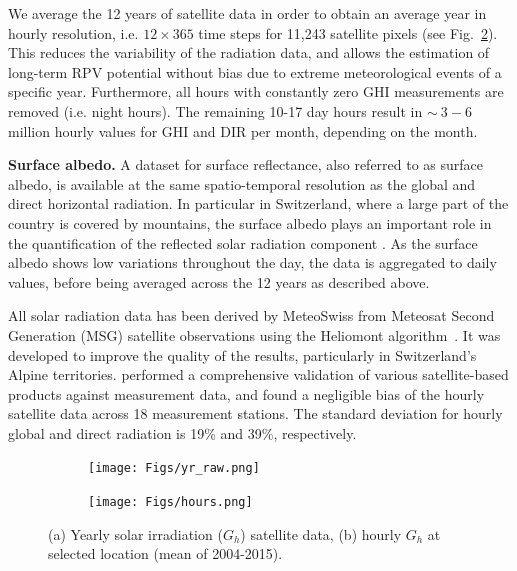 We average the 12 years of satellite data in order to obtain an average year in hourly resolution, i.e. $12 \times 365$ time steps for 11,243 satellite pixels (see Fig.~\ref{figb:GHI_patterns}). This reduces the variability of the radiation data, and allows the estimation of long-term RPV potential without bias due to extreme meteorological events of a specific year. Furthermore, all hours with constantly zero GHI measurements are removed (i.e. night hours). The remaining 10-17 day hours result in $\sim~3-6$ million hourly values for GHI and DIR per month, depending on the month. 

\textbf{Surface albedo.} A dataset for surface reflectance, also referred to as surface albedo, is available at the same spatio-temporal resolution as the global and direct horizontal radiation. In particular in Switzerland, where a large part of the country is covered by mountains, the surface albedo plays an important role in the quantification of the reflected solar radiation component \cite{kahl_bright_2019}. As the surface albedo shows low variations throughout the day, the data is aggregated to daily values, before being averaged across the 12 years as described above. 

All solar radiation data has been derived by MeteoSwiss from Meteosat Second Generation (MSG) satellite observations using the Heliomont algorithm~\cite{stockli_heliomont_2017}. It was developed to improve the quality of the results, particularly in Switzerland's Alpine territories. 
\citet{ineichen_long_2014} performed a comprehensive validation of various satellite-based products against measurement data, and found a negligible bias of the hourly satellite data across 18 measurement stations. 
The standard deviation for hourly global and direct radiation is 19\% and 39\%, respectively.

\begin{figure}[tb]
\centering
\begin{subfigure}{.49\textwidth}
  \centering
  \texttt{[image: Figs/yr\_raw.png]}  
  \caption{}
  \label{figa:GHI_patterns}
\end{subfigure}
\begin{subfigure}{.49\textwidth}
  \centering
  \texttt{[image: Figs/hours.png]}  
  \caption{}
  \label{figb:GHI_patterns}
\end{subfigure}
\caption{(a) Yearly solar irradiation ($G_h$) satellite data, (b) hourly $G_h$ at selected location (mean of 2004-2015).}
\label{fig:GHI_patterns}
\end{figure}

